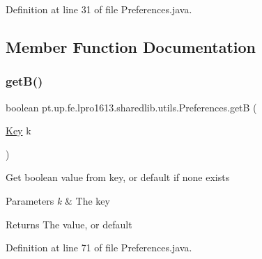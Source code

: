 Definition at line 31 of file Preferences.\+java.



\subsection{Member Function Documentation}
\hypertarget{classpt_1_1up_1_1fe_1_1lpro1613_1_1sharedlib_1_1utils_1_1_preferences_ad42ac07907c3bb6066925a1de8706007}{}\label{classpt_1_1up_1_1fe_1_1lpro1613_1_1sharedlib_1_1utils_1_1_preferences_ad42ac07907c3bb6066925a1de8706007} 
\subsubsection{\texorpdfstring{get\+B()}{getB()}}
{\footnotesize\ttfamily boolean pt.\+up.\+fe.\+lpro1613.\+sharedlib.\+utils.\+Preferences.\+getB (\begin{DoxyParamCaption}\item[{\hyperlink{interfacept_1_1up_1_1fe_1_1lpro1613_1_1sharedlib_1_1utils_1_1_preferences_1_1_key}{Key}}]{k }\end{DoxyParamCaption})}

Get boolean value from key, or default if none exists


\begin{DoxyParams}{Parameters}
{\em k} & The key \\
\hline
\end{DoxyParams}
\begin{DoxyReturn}{Returns}
The value, or default 
\end{DoxyReturn}


Definition at line 71 of file Preferences.\+java.

